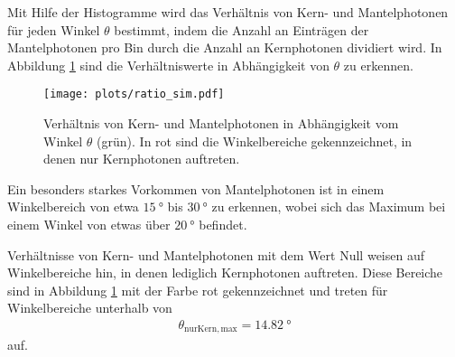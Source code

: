Mit Hilfe der Histogramme wird das Verhältnis von Kern- und Mantelphotonen für jeden Winkel $\theta$ bestimmt, indem die Anzahl an Einträgen der Mantelphotonen pro Bin durch die Anzahl an Kernphotonen dividiert wird. In Abbildung \ref{fig:ratio_sim} sind die Verhältniswerte in Abhängigkeit von $\theta$ zu erkennen.
\begin{figure}
    \centering
    \texttt{[image: plots/ratio\_sim.pdf]}
    \caption{Verhältnis von Kern- und Mantelphotonen in Abhängigkeit vom Winkel $\theta$ (grün). In rot sind die Winkelbereiche gekennzeichnet, in denen nur Kernphotonen auftreten.}
    \label{fig:ratio_sim}
\end{figure}
\FloatBarrier
Ein besonders starkes Vorkommen von Mantelphotonen ist in einem Winkelbereich von etwa $\SI{15}{°}$ bis $\SI{30}{°}$ zu erkennen, wobei sich das Maximum bei einem Winkel von etwas über $\SI{20}{°}$ befindet.

Verhältnisse von Kern- und Mantelphotonen mit dem Wert Null weisen auf Winkelbereiche hin, in denen lediglich Kernphotonen auftreten. Diese Bereiche sind in Abbildung \ref{fig:ratio_sim} mit der Farbe rot gekennzeichnet und treten für Winkelbereiche unterhalb von
\begin{align*}
    \theta_{\mathrm{nur Kern, max}} = \SI{14.82}{°}
\end{align*}
auf. \\

